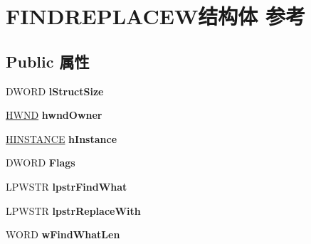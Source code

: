\hypertarget{struct_f_i_n_d_r_e_p_l_a_c_e_w}{}\section{F\+I\+N\+D\+R\+E\+P\+L\+A\+C\+E\+W结构体 参考}
\label{struct_f_i_n_d_r_e_p_l_a_c_e_w}
\subsection*{Public 属性}
\begin{DoxyCompactItemize}
\item 
\mbox{\label{struct_f_i_n_d_r_e_p_l_a_c_e_w_aae25236b9c0cfd3c8367d1450119579e}} 
D\+W\+O\+RD {\bfseries l\+Struct\+Size}
\item 
\mbox{\label{struct_f_i_n_d_r_e_p_l_a_c_e_w_a7724cd34016049fa2b0b91176c61949c}} 
\hyperlink{interfacevoid}{H\+W\+ND} {\bfseries hwnd\+Owner}
\item 
\mbox{\label{struct_f_i_n_d_r_e_p_l_a_c_e_w_ad0d50ddc92cdab68f2b7400d1ee34596}} 
\hyperlink{interfacevoid}{H\+I\+N\+S\+T\+A\+N\+CE} {\bfseries h\+Instance}
\item 
\mbox{\label{struct_f_i_n_d_r_e_p_l_a_c_e_w_a065fb36055a745fd7549bfc781c7517c}} 
D\+W\+O\+RD {\bfseries Flags}
\item 
\mbox{\label{struct_f_i_n_d_r_e_p_l_a_c_e_w_abbd8e89e1c8907341fc6b6cc458128af}} 
L\+P\+W\+S\+TR {\bfseries lpstr\+Find\+What}
\item 
\mbox{\label{struct_f_i_n_d_r_e_p_l_a_c_e_w_a9ad04f5450db5db61e506f5f9cf7df40}} 
L\+P\+W\+S\+TR {\bfseries lpstr\+Replace\+With}
\item 
\mbox{\label{struct_f_i_n_d_r_e_p_l_a_c_e_w_a876cc2688a915ae477147c7dd7ab3c66}} 
W\+O\+RD {\bfseries w\+Find\+What\+Len}
\item 
\mbox{\label{struct_f_i_n_d_r_e_p_l_a_c_e_w_a844b34e88a4f0a208398fdb51b011933}} 

\end{DoxyCompactItemize}

